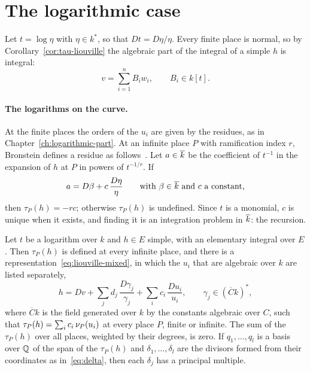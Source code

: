 \section{The logarithmic case}\label{sec:elem-log}

Let $t = \log \eta$ with $\eta \in k^*$, so that $Dt = D\eta/\eta$. Every
finite place is normal, so by Corollary~\ref{cor:tau-liouville} the algebraic
part of the integral of a simple $h$ is integral:
\begin{equation}\label{eq:log-v}
  v = \sum_{i=1}^n B_i w_i, \qquad B_i \in k[t] .
\end{equation}

\paragraph{The logarithms on the curve.} At the finite places the orders of
the $u_i$ are given by the residues, as in
Chapter~\ref{ch:logarithmic-part}. At an infinite place $P$ with
ramification index $r$, Bronstein defines a residue
as follows~\cite[Definition~2.10]{bronstein1990}. Let $a \in \overline{k}$ be the
coefficient of $t^{-1}$ in the expansion of $h$ at $P$ in powers of
$t^{-1/r}$. If
\begin{equation}\label{eq:tau-infinity}
  a = D\beta + c\, \frac{D\eta}{\eta}
  \qquad \text{with } \beta \in \overline{k} \text{ and } c \text{ a constant,}
\end{equation}
then $\tau_P(h) = -r c$; otherwise $\tau_P(h)$ is undefined. Since $t$ is a
monomial, $c$ is unique when it exists, and finding it is an integration
problem in $\overline{k}$: the recursion.

\begin{theorem}\label{thm:log-residues}
Let $t$ be a logarithm over $k$ and $h \in E$ simple, with an elementary
integral over $E$. Then $\tau_P(h)$ is defined at every infinite place, and
there is a representation~\eqref{eq:liouville-mixed}, in which the $u_i$ that
are algebraic over $k$ are listed separately,
\[
  h = Dv + \sum_j d_j\, \frac{D\gamma_j}{\gamma_j} + \sum_i c_i\, \frac{Du_i}{u_i},
  \qquad \gamma_j \in (\overline{C} k)^* ,
\]
where $\overline{C} k$ is the field generated over $k$ by the constants
algebraic over $C$,
such that $\tau_P(h) = \sum_i c_i\, \nu_{P}(u_i)$ at every place $P$, finite or
infinite. The sum of the $\tau_P(h)$ over all places, weighted by their
degrees, is zero. If $q_1, \dots, q_l$ is a basis over $\mathbb{Q}$ of the span of the
$\tau_P(h)$ and $\delta_1, \dots, \delta_l$ are the divisors formed from their
coordinates as in~\eqref{eq:delta}, then each $\delta_j$ has a principal
multiple.
\end{theorem}

